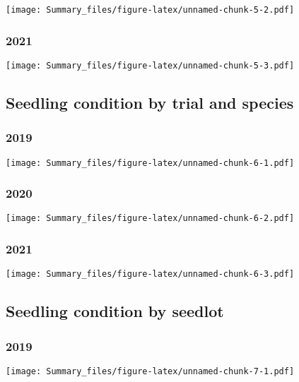 \documentclass[
]{article}
\begin{document}
\texttt{[image: Summary\_files/figure-latex/unnamed-chunk-5-2.pdf]}

\hypertarget{section-5}{%
\subsubsection{2021}\label{section-5}}

\texttt{[image: Summary\_files/figure-latex/unnamed-chunk-5-3.pdf]}

\hypertarget{seedling-condition-by-trial-and-species}{%
\subsection{Seedling condition by trial and
species}\label{seedling-condition-by-trial-and-species}}

\hypertarget{section-6}{%
\subsubsection{2019}\label{section-6}}

\texttt{[image: Summary\_files/figure-latex/unnamed-chunk-6-1.pdf]}

\hypertarget{section-7}{%
\subsubsection{2020}\label{section-7}}

\texttt{[image: Summary\_files/figure-latex/unnamed-chunk-6-2.pdf]}

\hypertarget{section-8}{%
\subsubsection{2021}\label{section-8}}

\texttt{[image: Summary\_files/figure-latex/unnamed-chunk-6-3.pdf]}

\hypertarget{seedling-condition-by-seedlot}{%
\subsection{Seedling condition by
seedlot}\label{seedling-condition-by-seedlot}}

\hypertarget{section-9}{%
\subsubsection{2019}\label{section-9}}

\texttt{[image: Summary\_files/figure-latex/unnamed-chunk-7-1.pdf]}
\end{document}
